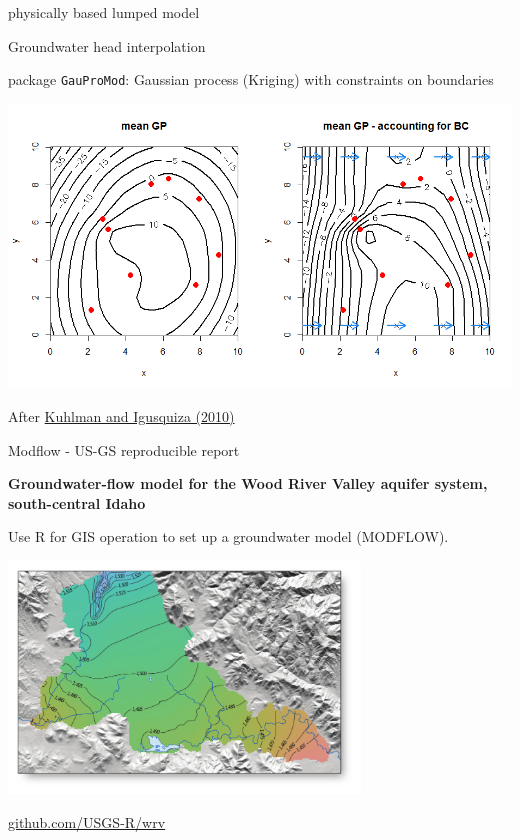 \documentclass[8pt,ignorenonframetext,]{beamer}
\begin{document}
\begin{frame}{physically based lumped model}

\end{frame}

\begin{frame}[fragile]{Groundwater head interpolation}

package \texttt{GauProMod}: Gaussian process (Kriging) with constraints
on boundaries

\includegraphics{imgPres/GP_head_interpolation.png}

After \href{https://doi.org/10.1016/j.jhydrol.2010.01.002}{Kuhlman and
Igusquiza (2010)}

\end{frame}

\begin{frame}{Modflow - US-GS reproducible report}

\textbf{Groundwater-flow model for the Wood River Valley aquifer system,
south-central Idaho}

Use R for GIS operation to set up a groundwater model (MODFLOW).

\includegraphics[width=0.70000\textwidth]{imgPres/wvrModel.png}

\href{https://github.com/USGS-R/wrv}{github.com/USGS-R/wrv}

\end{frame}
\end{document}
